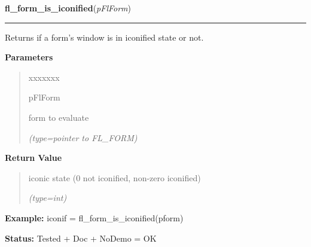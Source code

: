 \hspace{.8\funcindent}\begin{boxedminipage}{\funcwidth}

    \raggedright \textbf{fl\_form\_is\_iconified}(\textit{pFlForm})

    \vspace{-1.5ex}

    \rule{\textwidth}{0.5\fboxrule}
\setlength{\parskip}{2ex}
    Returns if a form's window is in iconified state or not.

\setlength{\parskip}{1ex}
      \textbf{Parameters}
      \vspace{-1ex}

      \begin{quote}
        \begin{Ventry}{xxxxxxx}

          \item[pFlForm]

          form to evaluate

            {\it (type=pointer to FL\_FORM)}

        \end{Ventry}

      \end{quote}

      \textbf{Return Value}
    \vspace{-1ex}

      \begin{quote}
      iconic state (0 not iconified, non-zero iconified)

      {\it (type=int)}

      \end{quote}

\textbf{Example:} iconif = fl\_form\_is\_iconified(pform)



\textbf{Status:} Tested + Doc + NoDemo = OK



    \end{boxedminipage}

    \label{xformslib:flbasic:fl_register_raw_callback}

    \vspace{0.5ex}

